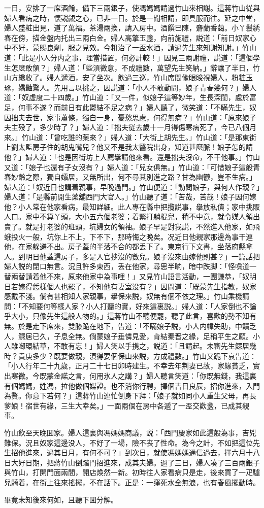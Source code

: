 一日，安排了一席酒餚，備下三兩銀子，使馮媽媽請過竹山來相謝。這蔣竹山従與婦人看病之時，懷覬覦之心，已非一日。於是一聞相請，即具服而往。延之中堂，婦人盛粧出見，道了萬福。茶湯兩換，請入房中。酒饌已陳，麝蘭香藹。小丫鬟綉春在傍，描金盤内托出三兩白金。婦人高擎玉盞，向前施禮，説道：「前日奴家心中不好，蒙賜良劑，服之見效。今粗治了一盃水酒，請過先生來知謝知謝。」竹山道：「此是小人分内之事，理當措置，何必計較！」因見三兩謝禮，説道：「這個學生怎麽敢領？」婦人道：「些湏微意，不成禮數，萬望先生笑納。」辭讓了半日，竹山方纔收了。婦人遞酒，安了坐次。飲過三巡，竹山席間偸眼睃視婦人，粉粧玉琢，嬌豔驚人。先用言以挑之，因説道：「小人不敢動問，娘子青春幾何？」婦人道：「奴虚度二十四歲。」竹山道：「又一件，似娘子這等妙年，生長深閨，處於富足，何事不遂？而前日有此鬱結不足之病？」婦人聽了，微笑道：「不瞞先生，奴因拙夫去世，家事蕭條，獨自一身，憂愁思慮，何得無病？」竹山道：「原來娘子夫主殁了，多少時了？」婦人道：「拙夫従去歲十一月得傷寒病死了，今已八個月來。」竹山道：「曾吃誰的薬來？」婦人道：「大街上胡先生。」竹山道：「是那東街上劉太監房子住的胡鬼嘴兒？他又不是我太醫院出身，知道甚麽脈！娘子怎的請他？」婦人道：「也是因街坊上人薦擧請他來看。還是拙夫沒命，不干他事。」竹山又道：「娘子也還有子女沒有？」婦人道：「兒女俱無。」竹山道：「可惜娘子這般青春妙齡之際，獨自孀居，又無所出，何不尋其別進之路？甘為幽鬱，豈不生病。」婦人道：「奴近日也講着親事，早晚過門。」竹山便道：「動問娘子，與何人作親？」婦人道：「是縣前開生薬舖西門大官人。」竹山聽了道：「苦哉，苦哉！娘子因何嫁他？小人常在他家看病，最知詳細。此人專在縣中把攬説事，擧放私債；家中挑販人口。家中不算丫頭，大小五六個老婆；着緊打躺棍兒，稍不中意，就令媒人領出賣了。就是打老婆的班頭，坑婦女的領袖。娘子早是對我説，不然進入他家，如飛蛾投火一般，坑你上不上，下不下，那時悔之晚矣。况近日他親家那邊為事干連他，在家躲避不出。房子蓋的半落不合的都丢下了。東京行下文書，坐落府縣拿人。到明日他蓋這房子，多是入官抄沒的數兒。娘子沒來由嫁他則甚？」一篇話把婦人説的閉口無言。況且許多東西，丢在他家，尋思半晌，暗中跌脚：「怪嗔道一替兩替請着他不來，原來他家中為事哩！」又見竹山語言活動，一團謙恭，「奴明日若嫁得恁樣個人也罷了，不知他有妻室没有？」因問道：「既蒙先生指教，奴家感戴不淺。倘有甚相知人家親事，擧保來説，奴無有個不依之理。」竹山乘機請問：「不知要何等樣人家？小人打聽的實，好來這裏説。」婦人道：「人家倒也不論乎大小，只像先生這般人物的。」這蔣竹山不聽便罷，聽了此言，喜歡的勢不知有無。於是走下席來，雙膝跪在地下，告道：「不瞞娘子説，小人内幃失助，中饋乏人，鰥居已久，子息全無。倘蒙娘子垂憐見愛，肯結秦晋之緣，足稱平生之願。小人雖啣環結草，不敢有忘！」婦人笑以手携之，説道：「且請起。未審先生鰥居幾時？貴庚多少？既要做親，湏得要個保山來説，方成禮數。」竹山又跪下哀告道：「小人行年二十九歲，正月二十七日卯時建生。不幸去年荆妻已故，家緣貧乏，實出寒微。今既蒙金諾之言，何用氷人之講？」婦人聽言笑道：「你既無錢，我這裏有個媽媽，姓馮，拉他做個媒證。也不消你行聘，擇個吉日良辰，招你進來，入門為贅。你意下若何？」這蔣竹山連忙倒身下拜：「娘子就如同小人重生父母，再長爹娘！宿世有緣，三生大幸矣。」一面兩個在房中各遞了一盃交歡盞，已成其親事。

竹山飲至天晚囬家。婦人這裏與馮媽媽商議，説：「西門慶家如此這般為事，吉兇難保。況且奴家這邊没人，不好了一場，險不丧了性命。為今之計，不如把這位先生招他進來，過其日月，有何不可？」到次日，就使馮媽媽通信過去，擇六月十八日大好日期，把蔣竹山倒踏門招進來，成其夫婦。過了三日，婦人凑了三百兩銀子與竹山，打開門面兩間，開店煥然一新。初時往人家看病只是走，後來買了一疋驢兒騎着，在街上往來搖擺，不在話下。正是：一窪死水全無浪，也有春風擺動時。

畢竟未知後來何如，且聽下囬分解。

